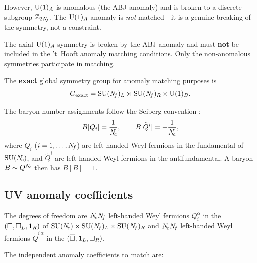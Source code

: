 \documentclass[11pt,a4paper]{article}
\begin{document}
However, $\UU{1}_A$ is anomalous (the ABJ anomaly) and is broken to a
discrete subgroup $\mathbb{Z}_{2N_{\!f}}$.  The $\UU{1}_A$ anomaly is
\emph{not} matched---it is a genuine breaking of the symmetry, not a
constraint.

\begin{warningbox}[title={Do not match the anomalous $\UU{1}_A$}]
  The axial $\UU{1}_A$ symmetry is broken by the ABJ anomaly and must
  \textbf{not} be included in the 't~Hooft anomaly matching conditions.
  Only the non-anomalous symmetries participate in matching.
\end{warningbox}

The \textbf{exact} global symmetry group for anomaly matching purposes is
\begin{equation}
  G_{\text{exact}}
  = \mathrm{SU}(N_{\!f})_L \times \mathrm{SU}(N_{\!f})_R \times \mathrm{U}(1)_B.
  \label{eq:exact-global-sym}
\end{equation}

The baryon number assignments follow the Seiberg convention
\cite{Seiberg1995}:
\begin{equation}
  B[Q_i] = \frac{1}{N_{\!c}}, \qquad
  B[\widetilde{Q}^i] = -\frac{1}{N_{\!c}},
  \label{eq:baryon-number}
\end{equation}
where $Q_i$ ($i = 1,\ldots,N_{\!f}$) are left-handed Weyl fermions in the
fundamental of $\mathrm{SU}(N_{\!c})$, and $\widetilde{Q}^i$ are left-handed Weyl
fermions in the antifundamental.  A baryon $B \sim Q^{N_{\!c}}$ then has
$B[B] = 1$.

\subsection{UV anomaly coefficients}

The \UV{} degrees of freedom are $N_{\!c} N_{\!f}$ left-handed Weyl fermions $Q_i^\alpha$
in the $(\square, \square_L, \mathbf{1}_R)$ of $\mathrm{SU}(N_{\!c}) \times \mathrm{SU}(N_{\!f})_L \times \mathrm{SU}(N_{\!f})_R$
and $N_{\!c} N_{\!f}$ left-handed Weyl fermions $\widetilde{Q}^{i\,\alpha}$ in the
$(\overline{\square}, \mathbf{1}_L, \square_R)$.

The independent anomaly coefficients to match are:
\end{document}
